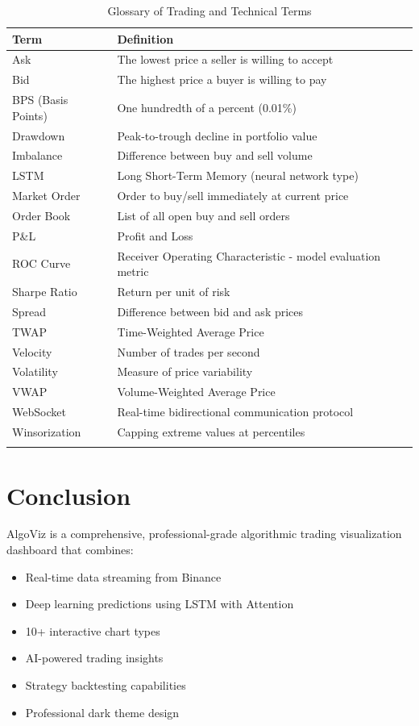 \documentclass[12pt,a4paper]{article}
\begin{document}
\begin{longtable}{lp{10cm}}
\toprule
\textbf{Term} & \textbf{Definition} \\
\midrule
\endhead
Ask & The lowest price a seller is willing to accept \\
Bid & The highest price a buyer is willing to pay \\
BPS (Basis Points) & One hundredth of a percent (0.01\%) \\
Drawdown & Peak-to-trough decline in portfolio value \\
Imbalance & Difference between buy and sell volume \\
LSTM & Long Short-Term Memory (neural network type) \\
Market Order & Order to buy/sell immediately at current price \\
Order Book & List of all open buy and sell orders \\
P\&L & Profit and Loss \\
ROC Curve & Receiver Operating Characteristic - model evaluation metric \\
Sharpe Ratio & Return per unit of risk \\
Spread & Difference between bid and ask prices \\
TWAP & Time-Weighted Average Price \\
Velocity & Number of trades per second \\
Volatility & Measure of price variability \\
VWAP & Volume-Weighted Average Price \\
WebSocket & Real-time bidirectional communication protocol \\
Winsorization & Capping extreme values at percentiles \\
\bottomrule
\caption{Glossary of Trading and Technical Terms}
\end{longtable}

\section{Conclusion}

\begin{importantbox}
AlgoViz is a comprehensive, professional-grade algorithmic trading visualization dashboard that combines:
\begin{itemize}
    \item Real-time data streaming from Binance
    \item Deep learning predictions using LSTM with Attention
    \item 10+ interactive chart types
    \item AI-powered trading insights
    \item Strategy backtesting capabilities
    \item Professional dark theme design
\end{itemize}
\end{importantbox}
\end{document}

